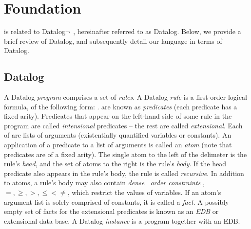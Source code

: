 \section{Foundation}
\label{sec:lang}

\lang is related to Datalog$\lnot$~\cite{ullmanbook}, hereinafter referred to as Datalog.  Below, we provide a brief review of Datalog, and subsequently detail our language in terms of Datalog.

\subsection{Datalog}
\label{sec:datalog}

A Datalog {\em program} comprises a set of {\em rules}.  A Datalog {\em rule} is a first-order logical formula, of the following form: .   are known as {\em predicates} (each predicate has a fixed arity).  Predicates that appear on the left-hand side of some rule in the program are called {\em intensional} predicates -- the rest are called {\em extensional}.  Each of  are lists of arguments (existentially quantified variables or constants).  An application of a predicate to a list of arguments is called an {\em atom} (note that predicates are of a fixed arity).  The single atom to the left of the \dedalus{:-} delimeter is the rule's {\em head}, and the set of atoms to the right is the rule's {\em body}.  If the head predicate also appears in the rule's body, the rule is called {\em recursive}.  In addition to atoms, a rule's body may also contain {\em dense~ order constraints}  , $=, \geq, >, \leq < \neq$, which restrict the values of variables.  If an atom's argument list is solely comprised of constants, it is called a {\em fact}.  A possibly empty set of facts for the extensional predicates is known as an {\em EDB} or extensional data base.  A Datalog {\em instance} is a program together with an EDB.   

